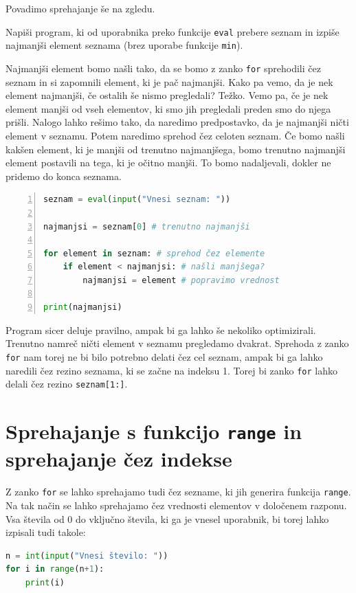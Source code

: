 Povadimo sprehajanje še na zgledu.
\begin{zgled}
Napiši program, ki od uporabnika preko funkcije \texttt{eval} prebere seznam in izpiše najmanjši element seznama (brez uporabe funkcije \texttt{min}). 
\end{zgled}
\begin{resitev}
Najmanjši element bomo našli tako, da se bomo z zanko \texttt{for} sprehodili čez seznam in si zapomnili element, ki je pač najmanjši. Kako pa vemo, da je nek element najmanjši, če ostalih še nismo pregledali? Težko. Vemo pa, če je nek element manjši od vseh elementov, ki smo jih pregledali preden smo do njega prišli. Nalogo lahko rešimo tako, da naredimo predpostavko, da je najmanjši ničti element v seznamu. Potem naredimo sprehod čez celoten seznam. Če bomo našli kakšen element, ki je manjši od trenutno najmanjšega, bomo trenutno najmanjši element postavili na tega, ki je očitno manjši. To bomo nadaljevali, dokler ne pridemo do konca seznama.
\begin{lstlisting}[language=Python,numbers=left]
seznam = eval(input("Vnesi seznam: "))

najmanjsi = seznam[0] # trenutno najmanjši

for element in seznam: # sprehod čez elemente
    if element < najmanjsi: # našli manjšega?
        najmanjsi = element # popravimo vrednost

print(najmanjsi)
\end{lstlisting}
Program sicer deluje pravilno, ampak bi ga lahko še nekoliko optimizirali. Trenutno namreč ničti element v seznamu pregledamo dvakrat. Sprehoda z zanko \texttt{for} nam torej ne bi bilo potrebno delati čez cel seznam, ampak bi ga lahko naredili čez rezino seznama, ki se začne na indeksu 1. Torej bi zanko \texttt{for} lahko delali čez rezino \texttt{seznam[1:]}.
\end{resitev}

\section{Sprehajanje s funkcijo \texttt{range} in sprehajanje čez indekse}

Z zanko \texttt{for} se lahko sprehajamo tudi čez sezname, ki jih generira funkcija \texttt{range}. Na tak način se lahko sprehajamo čez vrednosti elementov v določenem razponu. Vsa števila od 0 do vključno števila, ki ga je vnesel uporabnik, bi torej lahko izpisali tudi takole:
\begin{lstlisting}[language=Python]
n = int(input("Vnesi število: "))
for i in range(n+1):
    print(i)
\end{lstlisting}

